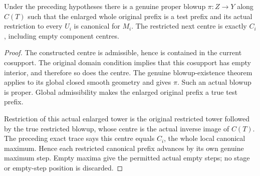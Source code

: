 \begin{theorem}
\label{hir:componentwise-canonical-global-refinement}
\leanok
Under the preceding hypotheses there is a genuine proper
blowup $\pi:Z\to Y$ along $C(T)$ such that the enlarged
whole original prefix is a test prefix and its actual
restriction to every $U_i$ is canonical for $M_i$.
The restricted next centre is exactly $C_i$, including
empty component centres.
\end{theorem}
\begin{proof}
The constructed centre is admissible, hence is contained in
the current cosupport. The original domain condition implies
that this cosupport has empty interior, and therefore so does
the centre. The genuine blowup-existence theorem applies to
its global closed smooth geometry and gives $\pi$. Such an
actual blowup is proper. Global admissibility makes the
enlarged original prefix a true test prefix.

Restriction of this actual enlarged tower is the original
restricted tower followed by the true restricted blowup,
whose centre is the actual inverse image of $C(T)$. The
preceding exact trace says this centre equals $C_i$, the
whole local canonical maximum. Hence each restricted
canonical prefix advances by its own genuine maximum
step. Empty maxima give the permitted actual empty steps;
no stage or empty-step position is discarded.
\end{proof}

